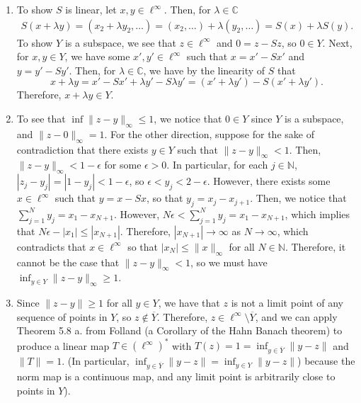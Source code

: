 \documentclass[11pt]{article}
\newcommand{\C}{\mathbb{C}}
\newcommand{\N}{\mathbb{N}}
\begin{document}
\begin{enumerate}[label=\arabic*., leftmargin=*, itemsep=10pt]
\begin{enumerate}
    \item To show $S$ is linear, let $x, y \in \ell^{\infty}$.
        Then, for $\lambda \in \C$
        \begin{align*}
            S(x + \lambda y) = (x_2 + \lambda y_2, \ldots) = (x_2, \ldots) + \lambda (y_2, \ldots) = S(x) + \lambda S(y)
        .\end{align*}
        To show $Y$ is a subspace, we see that $z \in \ell^{\infty}$ and $0 = z - Sz$, so $0 \in Y$.
        Next, for $x, y \in Y$, we have some $x', y' \in \ell^{\infty}$ such that $x = x' - Sx'$ and $y = y' - Sy'$.
        Then, for $\lambda \in \C$, we have by the linearity of $S$ that 
        \[
            x + \lambda y  = x' - S x' + \lambda y' - S \lambda y' = (x' + \lambda y') - S(x' + \lambda y')
        .\] 
        Therefore, $x + \lambda y \in Y$.
    \item To see that $\inf \|z - y\|_{\infty} \leq 1$, we notice that $0 \in Y$ since $Y$ is a subspace, and $\|z - 0\|_{\infty} = 1$.
        For the other direction, suppose for the sake of contradiction that there exists $y \in Y$ such that $\|z - y\|_{\infty} < 1$. Then, $\|z - y\|_{\infty} < 1 - \epsilon$ for some $\epsilon > 0$.
        In particular, for each $j \in \N$, $|z_j - y_j| = | 1 - y_j| < 1 - \epsilon$, so $\epsilon < y_j < 2 - \epsilon$.
        However, there exists some $x \in \ell^{\infty}$ such that $y = x - S x$, so that $y_j = x_j - x_{j+1}$.
        Then, we notice that $\sum_{j = 1}^{N} y_j = x_1 - x_{N+1}$.
        However, $N\epsilon < \sum_{j = 1}^{N}y_j = x_1 - x_{N+1}$, which implies that $N \epsilon - |x_1| \leq |x_{N+1}|$.
        Therefore, $|x_{N+1}| \to \infty$ as $N \to \infty$, which contradicts that $x \in \ell^{\infty}$ so that $|x_N| \leq \|x\|_{\infty}$ for all $N \in \N$.
        Therefore, it cannot be the case that $\|z - y\|_{\infty} < 1$, so we must have $\inf_{y \in Y} \|z  - y\|_{\infty} \geq 1$.
    \item Since $\|z - y\| \geq 1$ for all $y \in Y$, we have that $z$ is not a limit point of any sequence of points in $Y$, so $z \not\in  \overline{Y}$.
        Therefore, $z \in \ell^{\infty} \setminus \overline{Y}$, and we can apply Theorem 5.8 a. from Folland (a Corollary of the Hahn Banach theorem) to produce a linear map $T \in (\ell^{\infty})^{*}$ with $T(z) = 1 = \inf_{y \in \overline{Y}} \|y - z\|$ and $\|T\| = 1$.
        (In particular, $\inf_{y \in \overline{Y}} \|y - z\| = \inf_{y \in Y} \|y - z\|$) because the norm map is a continuous map, and any limit point is arbitrarily close to points in $Y$).

\end{enumerate}
\end{enumerate}
\end{document}
